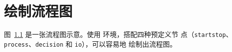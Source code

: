 
\chapter{绘制流程图}

图~\ref{fig:flow_chart} 是一张流程图示意。使用  环境，搭配四种预定义节
点（\verb|startstop|、\verb|process|、\verb|decision| 和 \verb|io|），可以容易地
绘制出流程图。

\begin{figure}[!htp]
  \centering
  
  \label{fig:flow_chart}
\end{figure}
